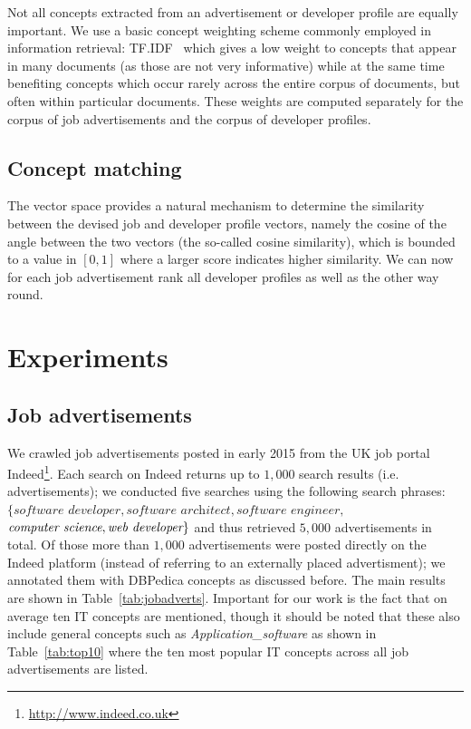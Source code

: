 \documentclass[conference]{IEEEtran}
\begin{document}
Not all concepts extracted from an advertisement or developer profile are
equally important. We use a basic concept weighting scheme commonly employed in information retrieval: TF.IDF~\cite{baeza1999modern} which gives a low weight to concepts that appear in many documents (as those are not very informative) while at the same time benefiting concepts which occur rarely across the entire corpus of documents, but often within particular documents. These weights are computed separately for the corpus of job advertisements and the corpus of developer profiles. 


\subsection{Concept matching}

The vector space provides a natural mechanism to determine the similarity
between the devised job and developer profile vectors, namely the cosine of the
angle between the two vectors (the so-called cosine similarity), which is
bounded to a value in $[0,1]$ where a larger score indicates higher similarity.
We can now for each job advertisement rank all developer profiles as well as the
other way round.

\section{Experiments}

\subsection{Job advertisements} 
We crawled job advertisements posted in early 2015 from the UK job portal  Indeed\footnote{\url{http://www.indeed.co.uk}}. Each search on Indeed returns up to $1,000$ search results (i.e. advertisements); we conducted five searches using the following search phrases: $\{\textit{software developer}, \textit{software architect}, \textit{software engineer},$ $\emph{computer science}, \emph{web developer}\}$ and thus retrieved $5,000$ advertisements in total. Of those more than $1,000$ advertisements were posted directly on the Indeed platform (instead of referring to an externally placed advertisment); we annotated them with DBPedica concepts as discussed before. The main results are shown in Table~\ref{tab:jobadverts}. Important for our work is the fact that on average ten IT concepts are mentioned, though it should be noted that these also include general concepts such as \emph{Application\_software} as shown in Table~\ref{tab:top10} where the ten most popular IT concepts across all job advertisements are listed.
\end{document}

